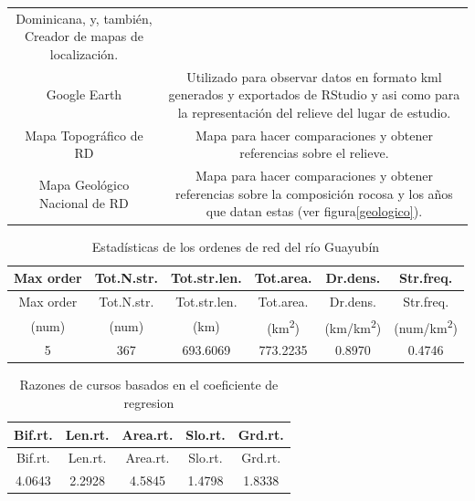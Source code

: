 \documentclass[11pt,]{article}
\begin{document}
\begin{longtable}[]{@{}cc@{}}
\begin{minipage}[t]{0.83\columnwidth}
Dominicana, y, también, Creador de mapas de localización.\strut
\end{minipage}\tabularnewline
\begin{minipage}[t]{0.11\columnwidth}\centering\strut
Google Earth\strut
\end{minipage} & \begin{minipage}[t]{0.83\columnwidth}\centering\strut
Utilizado para observar datos en formato kml generados y exportados de
RStudio y asi como para la representación del relieve del lugar de
estudio.\strut
\end{minipage}\tabularnewline
\begin{minipage}[t]{0.11\columnwidth}\centering\strut
Mapa Topográfico de RD\strut
\end{minipage} & \begin{minipage}[t]{0.83\columnwidth}\centering\strut
Mapa para hacer comparaciones y obtener referencias sobre el
relieve.\strut
\end{minipage}\tabularnewline
\begin{minipage}[t]{0.11\columnwidth}\centering\strut
Mapa Geológico Nacional de RD\strut
\end{minipage} & \begin{minipage}[t]{0.83\columnwidth}\centering\strut
Mapa para hacer comparaciones y obtener referencias sobre la composición
rocosa y los años que datan estas (ver figura\ref{geologico}).\strut
\end{minipage}\tabularnewline
\bottomrule
\end{longtable}

\begin{longtable}[]{@{}cccccc@{}}
\caption{\label{tab:estadisticaor} Estadísticas de los ordenes de red
del río Guayubín}\tabularnewline
\toprule
Max order & Tot.N.str. & Tot.str.len. & Tot.area. & Dr.dens. &
Str.freq.\tabularnewline
\midrule
\endfirsthead
\toprule
Max order & Tot.N.str. & Tot.str.len. & Tot.area. & Dr.dens. &
Str.freq.\tabularnewline
\midrule
\endhead
(num) & (num) & (km) & (km\textsuperscript{2}) &
(km/km\textsuperscript{2}) & (num/km\textsuperscript{2})\tabularnewline
5 & 367 & 693.6069 & 773.2235 & 0.8970 & 0.4746\tabularnewline
\bottomrule
\end{longtable}

\begin{longtable}[]{@{}ccccc@{}}
\caption{\label{tab:regresionc} Razones de cursos basados en el
coeficiente de regresion}\tabularnewline
\toprule
Bif.rt. & Len.rt. & Area.rt. & Slo.rt. & Grd.rt.\tabularnewline
\midrule
\endfirsthead
\toprule
Bif.rt. & Len.rt. & Area.rt. & Slo.rt. & Grd.rt.\tabularnewline
\midrule
\endhead
4.0643 & 2.2928 & 4.5845 & 1.4798 & 1.8338\tabularnewline
\bottomrule
\end{longtable}
\end{document}
